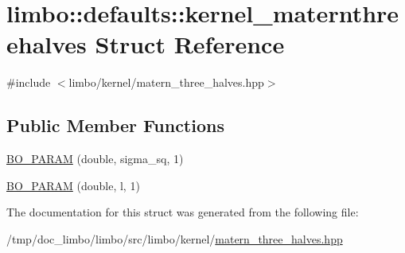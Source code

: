 \hypertarget{structlimbo_1_1defaults_1_1kernel__maternthreehalves}{}\section{limbo\+:\+:defaults\+:\+:kernel\+\_\+maternthreehalves Struct Reference}
\label{structlimbo_1_1defaults_1_1kernel__maternthreehalves}


{\ttfamily \#include $<$limbo/kernel/matern\+\_\+three\+\_\+halves.\+hpp$>$}

\subsection*{Public Member Functions}
\begin{DoxyCompactItemize}
\item 
\hyperlink{group__kernel__defaults_ga76321c51e14ac1db904dd1411771e391}{B\+O\+\_\+\+P\+A\+R\+A\+M} (double, sigma\+\_\+sq, 1)
\item 
\hyperlink{group__kernel__defaults_ga5e0b13e8fe6cc8b335d86ed94631225d}{B\+O\+\_\+\+P\+A\+R\+A\+M} (double, l, 1)
\end{DoxyCompactItemize}


The documentation for this struct was generated from the following file\+:\begin{DoxyCompactItemize}
\item 
/tmp/doc\+\_\+limbo/limbo/src/limbo/kernel/\hyperlink{matern__three__halves_8hpp}{matern\+\_\+three\+\_\+halves.\+hpp}\end{DoxyCompactItemize}
